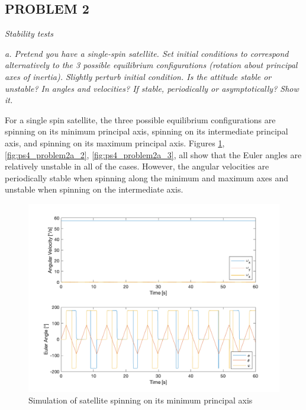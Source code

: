 \subsection{PROBLEM 2}
\textit{Stability tests}

\textit{a. Pretend you have a single-spin satellite. Set initial conditions to correspond alternatively to the 3 possible equilibrium configurations (rotation about principal axes of inertia). Slightly perturb initial condition. Is the attitude stable or unstable? In angles and velocities? If stable, periodically or asymptotically? Show it.}

For a single spin satellite, the three possible equilibrium configurations are spinning on its minimum principal axis, spinning on its intermediate principal axis, and spinning on its
maximum principal axis. Figures \ref{fig:ps4_problem2a_1}, \ref{fig:ps4_problem2a_2}, \ref{fig:ps4_problem2a_3}, all show that the Euler angles are relatively unstable in all of the cases. However, the angular velocities are periodically stable when spinning along the minimum and maximum axes and unstable when spinning on the intermediate axis.

\begin{figure}[H]
\centering
\includegraphics[scale=0.6]{Images/ps4_problem2a_1.png}
\caption{Simulation of satellite spinning on its minimum principal axis}
\label{fig:ps4_problem2a_1}
\end{figure}

